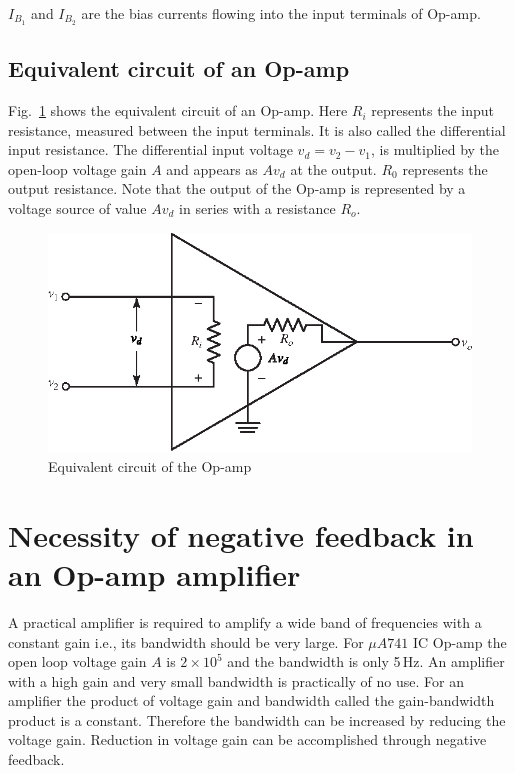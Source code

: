 $I_{B_{1}}$ and $I_{B_{2}}$ are the bias currents flowing into the input terminals of Op-amp.

\subsection{Equivalent circuit of an Op-amp}\label{sec5.1.7}

Fig.~\ref{fig5.4} shows the equivalent circuit of an Op-amp. Here $R_{i}$ represents the input resistance, measured between the input terminals. It is also called the differential input resistance. The differential input voltage $v_{d}=v_{2}-v_{1}$, is multiplied by the open-loop voltage gain $A$ and appears as $Av_{d}$ at the output. $R_{0}$ represents the output resistance. Note that the output of the Op-amp is represented by a voltage source of value $Av_{d}$ in series with a resistance $R_{o}$.
\begin{figure}[H]
\centering
\includegraphics{chap4/S3-EE-06-005.eps}
\caption{Equivalent circuit of the Op-amp}\label{fig5.4}
\end{figure}

\section{Necessity of negative feedback in an Op-amp amplifier}\label{sec5.3}

A practical amplifier is required to amplify a wide band of frequencies with a constant gain i.e., its bandwidth should be very large. For $\mu A741$ IC Op-amp the open loop voltage gain $A$ is $2\times 10^{5}$ and the bandwidth is only 5\,Hz. An amplifier with a high gain and very small bandwidth is practically of no use. For an amplifier the product of voltage gain and bandwidth called the gain-bandwidth product is a constant. Therefore the bandwidth can be increased by reducing the voltage gain. Reduction in voltage gain can be accomplished through negative feedback.

